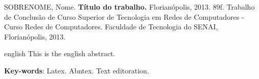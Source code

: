 \noindent
SOBRENOME, Nome. \textbf{Título do trabalho.}
Florianópolis, 2013. 89f. Trabalho de Conclusão de Curso Superior de Tecnologia em
Redes de Computadores - Curso Redes de Computadores. Faculdade de Tecnologia do
SENAI, Florianópolis, 2013.

\vspace{1cm}
\begin{resumo}
 \begin{otherlanguage*}{english}
   This is the english abstract.

   \vspace{\onelineskip}
 
   \noindent 
   \textbf{Key-words}: Latex. Abntex. Text editoration.
 \end{otherlanguage*}
\end{resumo}

